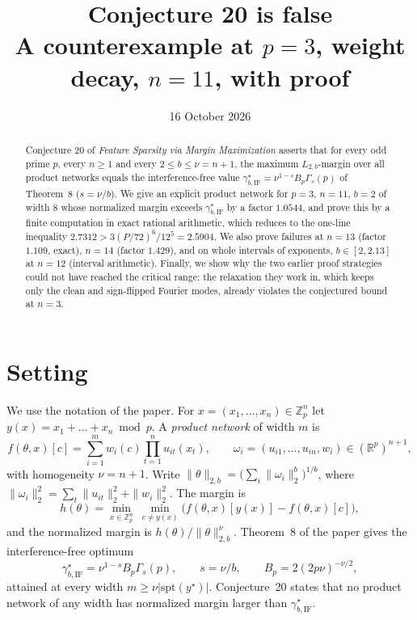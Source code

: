 \documentclass[11pt]{article}
\title{Conjecture 20 is false\\[2pt] \large A counterexample at $p=3$, weight decay, $n=11$, with proof}
\date{16 October 2026}
\author{}
\theoremstyle{definition}
\newcommand{\Z}{\mathbb{Z}}
\newcommand{\R}{\mathbb{R}}
\newcommand{\gIF}{\gamma^{\star}_{b,\mathrm{IF}}}
\begin{document}
\maketitle

\begin{abstract}
Conjecture 20 of \emph{Feature Sparsity via Margin Maximization} asserts that for every odd prime $p$, every $n\ge 1$
and every $2\le b\le \nu=n+1$, the maximum $L_{2,b}$-margin over all product networks equals the interference-free
value $\gIF=\nu^{1-s}B_p\Gamma_s(p)$ of Theorem~8 ($s=\nu/b$). We give an explicit product network for $p=3$,
$n=11$, $b=2$ of width $8$ whose normalized margin exceeds $\gIF$ by a factor $1.0544$, and prove this by a
finite computation in exact rational arithmetic, which reduces to the one-line inequality
$2.7312>3(P/72)^6/12^5=2.5904$. We also prove failures at $n=13$ (factor $1.109$, exact), $n=14$ (factor $1.429$), and on whole
intervals of exponents, $b\in[2,2.13]$ at $n=12$ (interval arithmetic). Finally, we show why the two
earlier proof strategies could not have reached the critical range: the relaxation they work in, which keeps
only the clean and sign-flipped Fourier modes, already violates the conjectured bound at $n=3$.
\end{abstract}

\section{Setting}

We use the notation of the paper. For $x=(x_1,\dots,x_n)\in\Z_p^n$ let $y(x)=x_1+\dots+x_n \bmod p$. A
\emph{product network} of width $m$ is
\[
f(\theta,x)[c]=\sum_{i=1}^m w_i(c)\prod_{t=1}^n u_{it}(x_t),\qquad \omega_i=(u_{i1},\dots,u_{in},w_i)\in(\R^p)^{n+1},
\]
with homogeneity $\nu=n+1$. Write $\|\theta\|_{2,b}=\big(\sum_i\|\omega_i\|_2^b\big)^{1/b}$, where
$\|\omega_i\|_2^2=\sum_t\|u_{it}\|_2^2+\|w_i\|_2^2$. The margin is
\[
h(\theta)=\min_{x\in\Z_p^n}\ \min_{c\ne y(x)}\big(f(\theta,x)[y(x)]-f(\theta,x)[c]\big),
\]
and the normalized margin is $h(\theta)/\|\theta\|_{2,b}^{\nu}$. Theorem~8 of the paper gives the
interference-free optimum
\[
\gIF=\nu^{1-s}B_p\Gamma_s(p),\qquad s=\nu/b,\qquad B_p=2(2p\nu)^{-\nu/2},
\]
attained at every width $m\ge\nu|\mathrm{spt}(y^\star)|$. Conjecture~20 states that no product network of any
width has normalized margin larger than $\gIF$.
\end{document}

